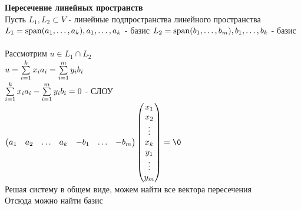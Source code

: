 \documentclass[12pt]{article}
\begin{document}
\textbf{Пересечение линейных пространств}\\
Пусть $L_1, L_2 \subset V$ - линейные подпространства линейного пространства\\
$L_1 = \operatorname{span} (a_1, \ldots, a_k), a_1, \ldots, a_k$ - базис
$L_2 = \operatorname{span} (b_1, \ldots, b_m), b_1, \ldots, b_k$ - базис\\\\
Рассмотрим $u \in L_1 \cap L_2$\\
$u = \sum\limits_{i=1}^k x_i a_i = \sum\limits_{i=1}^m y_i b_i$\\
$\sum\limits_{i=1}^k x_i a_i - \sum\limits_{i=1}^m y_i b_i = 0$ - СЛОУ\\
$\begin{pmatrix}
    a_1 & a_2 & \ldots & a_k & -b_1 & \ldots & -b_m
\end{pmatrix}\begin{pmatrix}
    x_1\\x_2\\\vdots\\x_k\\y_1\\\vdots\\y_m
\end{pmatrix} = \0$\\
Решая систему в общем виде, можем найти все вектора пересечения\\
Отсюда можно найти базис\\
\end{document}
